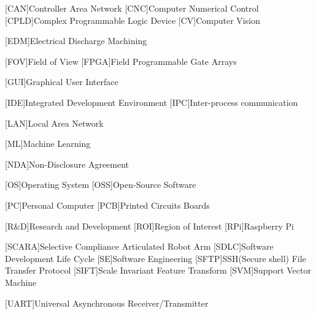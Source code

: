 \begin{acronym}
	[CAN]{Controller Area Network}
	[CNC]{Computer Numerical Control}
	[CPLD]{Complex Programmable Logic Device}
	[CV]{Computer Vision}
	
	[EDM]{Electrical Discharge Machining}
	
	[FOV]{Field of View}
	[FPGA]{Field Programmable Gate Arrays}
	
	[GUI]{Graphical User Interface}
	
	[IDE]{Integrated Development Environment}
	[IPC]{Inter-process communication}
	
	[LAN]{Local Area Network}
	
	[ML]{Machine Learning}
	
	[NDA]{Non-Disclosure Agreement}
	
	[OS]{Operating System}
	[OSS]{Open-Source Software}
	
	[PC]{Personal Computer}
	[PCB]{Printed Circuits Boards}
	
	[R\&D]{Research and Development}
	[ROI]{Region of Interest}
	[RPi]{Raspberry Pi}
			
	[SCARA]{Selective Compliance Articulated Robot Arm}
	[SDLC]{Software Development Life Cycle}
	[SE]{Software Engineering}
	[SFTP]{SSH(Secure shell) File Transfer Protocol}
	[SIFT]{Scale Invariant Feature Transform}
	[SVM]{Support Vector Machine}
	
	[UART]{Universal Asynchronous Receiver/Transmitter}
\end{acronym}

